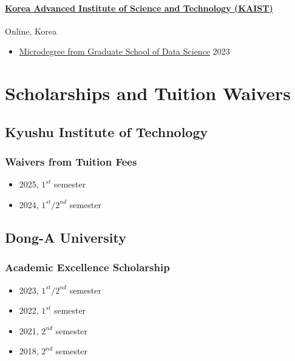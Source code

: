 \documentclass[a4paper,9pt]{extarticle}
\begin{document}
\paragraph{\large{\href{https://gsds.kaist.ac.kr}{Korea Advanced Institute of Science and Technology (KAIST)}}}  \hfill Online, Korea
\begin{itemize}
    \item \href{https://github.com/user-attachments/assets/b404e1df-2798-48de-8385-c9a6c7389b38}{Microdegree from Graduate School of Data Science}                      \hfill 2023
\end{itemize}


\section*{Scholarships and Tuition Waivers}
\subsection*{Kyushu Institute of Technology} 
\subsubsection*{Waivers from Tuition Fees}
\begin{itemize}
    \item 2025, $1^{st}$ semester 
    \item 2024, $1^{st} / 2^{nd}$ semester 
\end{itemize} 

\subsection*{Dong-A University} 
\subsubsection*{Academic Excellence Scholarship}
\begin{itemize}
    \item 2023, $1^{st} / 2^{nd}$ semester 
    \item 2022, $1^{st}$ semester 
    \item 2021, $2^{nd}$ semester 
    \item 2018, $2^{nd}$ semester 
\end{itemize} 
\end{document}
